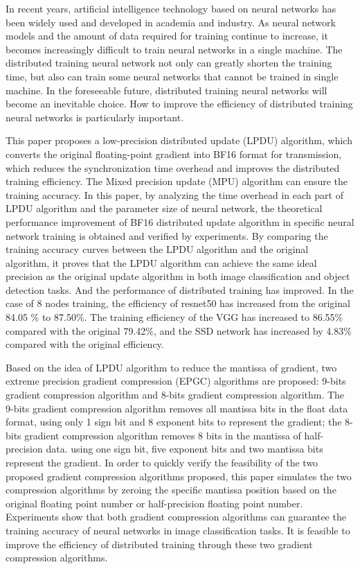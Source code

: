 \begin{eabstract}
In recent years, artificial intelligence technology based on neural networks has been widely used and developed in academia and industry. As neural network models and the amount of data required for training continue to increase, it becomes increasingly difficult to train neural networks in a single machine. The distributed training neural network not only can greatly shorten the training time, but also can train some neural networks that cannot be trained in single machine. In the foreseeable future, distributed training neural networks will become an inevitable choice. How to improve the efficiency of distributed training neural networks is particularly important.

This paper proposes a low-precision distributed update (LPDU) algorithm, which converts the original floating-point gradient into BF16 format for transmission, which reduces the synchronization time overhead and improves the distributed training efficiency. The Mixed precision update  (MPU) algorithm can ensure the training accuracy. In this paper, by analyzing the time overhead in each part of LPDU algorithm and the parameter size of neural network, the theoretical performance improvement of BF16 distributed update algorithm in specific neural network training is obtained and verified by experiments. By comparing the training accuracy curves between the LPDU algorithm and the original algorithm, it proves that the LPDU algorithm can achieve the same ideal precision as the original update algorithm in both image classification and object detection tasks. And the performance of distributed training has improved. In the case of 8 nodes training, the efficiency of resnet50 has increased from the original 84.05 \% to 87.50\%. The training efficiency of the VGG has increased to 86.55\% compared with the original 79.42\%, and the SSD network has increased by 4.83\% compared with the original efficiency.

Based on the idea of LPDU algorithm to reduce the mantissa of gradient, two extreme precision gradient compression (EPGC) algorithms are proposed: 9-bits gradient compression algorithm and 8-bits gradient compression algorithm. The 9-bits gradient compression algorithm removes all mantissa bits in the float data format, using only 1 sign bit and 8 exponent bits to represent the gradient; the 8-bits gradient compression algorithm removes 8 bits in the mantissa of half-precision data. using one sign bit, five exponent bits and two mantissa bits represent the gradient. In order to quickly verify the feasibility of the two proposed gradient compression algorithms proposed, this paper simulates the two compression algorithms by zeroing the specific mantissa position based on the original floating point number or half-precision floating point number. Experiments show that both gradient compression algorithms can guarantee the training accuracy of neural networks in image classification tasks. It is feasible to improve the efficiency of distributed training through these two gradient compression algorithms.

\end{eabstract}

